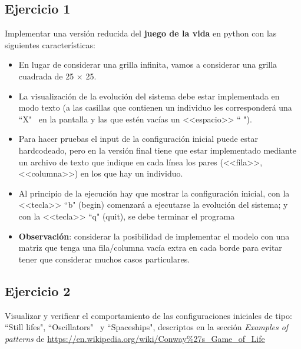 \documentclass[a4paper]{article}
\begin{document}
\subsection{Ejercicio 1}

Implementar una versión reducida del \textbf{juego de la vida} en 
python con las siguientes características:

\begin{itemize}
	\item En lugar de considerar una grilla infinita, vamos a considerar  
	una grilla cuadrada de 25 $\times$ 25.
	\item La visualización de la evolución del sistema debe estar 
	implementada en modo texto (a las casillas que contienen un 
	individuo les corresponderá una ``X" \ en la pantalla y las que estén 
	vacías un <<espacio>> `` ").
	\item Para hacer pruebas el input de la configuración inicial puede estar 
	hardcodeado, pero en la versión final tiene que estar implementado 
	mediante un archivo de texto que indique en cada línea los pares 
	(<<fila>>, <<columna>>) en los que hay un individuo. 
	\item Al principio de la ejecución hay que mostrar la 
	configuración inicial, con la <<tecla>> ``b" (begin) comenzará a 
	ejecutarse la evolución del sistema; y con la <<tecla>> ``q" (quit), 
	se debe terminar el programa
	\item \textbf{Observación}: considerar la posibilidad de implementar el 
	modelo con una matriz que tenga una fila/columna vacía extra en cada 
	borde para evitar tener que considerar muchos casos particulares.	
\end{itemize}

\subsection{Ejercicio 2}
Visualizar y verificar el comportamiento de las configuraciones 
iniciales de tipo: ``Still lifes", ``Oscillators" \ y ``Spaceships", 
descriptos en la sección \emph{Examples of patterns} de \url{https://en.wikipedia.org/wiki/Conway%27s_Game_of_Life}
\end{document}
